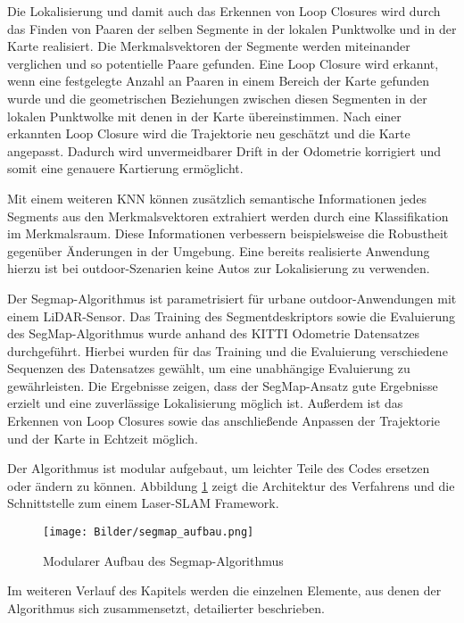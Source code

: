 Die Lokalisierung und damit auch das Erkennen von Loop Closures wird durch das Finden von Paaren der selben Segmente in der lokalen Punktwolke und in der Karte realisiert. Die Merkmalsvektoren der Segmente werden miteinander verglichen und so potentielle Paare gefunden. Eine Loop Closure wird erkannt, wenn eine festgelegte Anzahl an Paaren in einem Bereich der Karte gefunden wurde und die geometrischen Beziehungen zwischen diesen Segmenten in der lokalen Punktwolke mit denen in der Karte übereinstimmen. Nach einer erkannten Loop Closure wird die Trajektorie neu geschätzt und die Karte angepasst. Dadurch wird unvermeidbarer Drift in der Odometrie korrigiert und somit eine genauere Kartierung ermöglicht. 

Mit einem weiteren KNN können zusätzlich semantische Informationen jedes Segments aus den Merkmalsvektoren extrahiert werden durch eine Klassifikation im Merkmalsraum. Diese Informationen verbessern beispielsweise die   Robustheit gegenüber Änderungen in der Umgebung. Eine bereits realisierte Anwendung hierzu ist bei outdoor-Szenarien keine Autos zur Lokalisierung zu verwenden. 

Der Segmap-Algorithmus ist parametrisiert für urbane outdoor-Anwendungen mit einem LiDAR-Sensor. Das Training des Segmentdeskriptors sowie die Evaluierung des SegMap-Algorithmus wurde anhand des KITTI Odometrie Datensatzes durchgeführt. Hierbei wurden für das Training und die Evaluierung verschiedene Sequenzen des Datensatzes gewählt, um eine unabhängige Evaluierung zu gewährleisten. Die Ergebnisse zeigen, dass der SegMap-Ansatz gute Ergebnisse erzielt und eine zuverlässige Lokalisierung möglich ist. Außerdem ist das Erkennen von Loop Closures sowie das anschließende Anpassen der Trajektorie und der Karte in Echtzeit möglich. 

Der Algorithmus ist modular aufgebaut, um leichter Teile des Codes ersetzen oder ändern zu können. Abbildung \ref{fig:segmap} zeigt die Architektur des Verfahrens und die Schnittstelle zum einem Laser-SLAM Framework. 

\begin{figure}
    \centering
    \texttt{[image: Bilder/segmap\_aufbau.png]}
    \caption{Modularer Aufbau des Segmap-Algorithmus \cite{Dube2018}}
    \label{fig:segmap}
\end{figure}

Im weiteren Verlauf des Kapitels werden die einzelnen Elemente, aus denen der Algorithmus sich zusammensetzt, detailierter beschrieben. 

